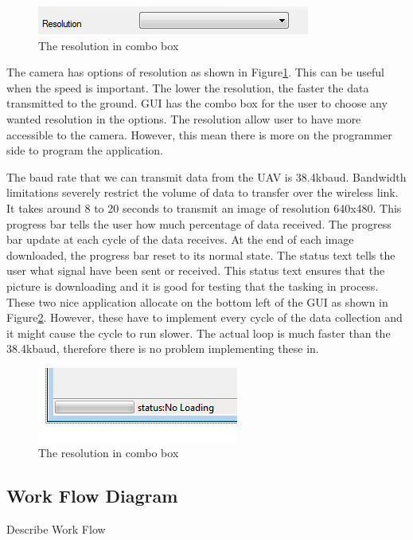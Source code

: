 \begin{figure}[!hbtp]
\begin{center}
\includegraphics[scale=1]{resolutionOption.PNG} 
\end{center}
\caption{The resolution in combo box\label{resolutionOption}}
\end{figure}
The camera has options of resolution as shown in Figure\ref{resolutionOption}. This can be useful when the speed is important. The lower the resolution, the faster the data transmitted to the ground. GUI has the combo box for the user to choose any wanted resolution in the options. The resolution allow user to have more accessible to the camera. However, this mean there is more on the programmer side to program the application.


The baud rate that we can transmit data from the UAV is 38.4kbaud. Bandwidth limitations severely restrict the volume of data to transfer over the wireless link. It takes around 8 to 20 seconds to transmit an image of resolution 640x480. This progress bar tells the user how much percentage of data received. The progress bar update at each cycle of the data receives. At the end of each image downloaded, the progress bar reset to its normal state.  The status text tells the user what signal have been sent or received. This status text ensures that the picture is downloading and it is good for testing that the tasking in process. These two nice application allocate on the bottom left of the GUI as shown in Figure\ref{progressBar}. However, these have to implement every cycle of the data collection and it might cause the cycle to run slower. The actual loop is much faster than the 38.4kbaud, therefore there is no problem implementing these in.
\begin{figure}[!hbtp]
\begin{center}
\includegraphics[scale=1]{progressBar.PNG} 
\end{center}
\caption{The resolution in combo box\label{progressBar}}
\end{figure}


\subsection{Work Flow Diagram}
Describe Work Flow

